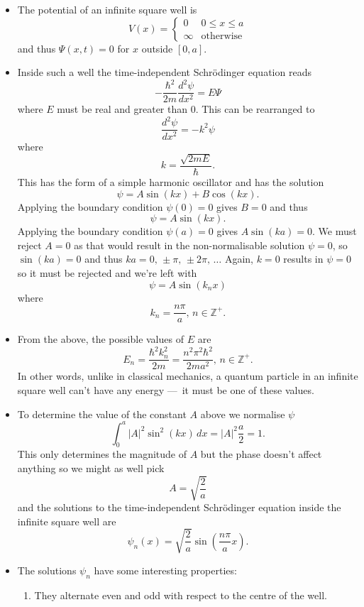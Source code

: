 \documentclass{article}
\begin{document}
\begin{itemize}
  \item The potential of an infinite square well is \[V(x) = \begin{cases}
            0      & 0 \le x \le a    \\
            \infty & \text{otherwise}
          \end{cases}\] and thus $\Psi(x, t) = 0$ for $x$ outside $[0, a]$.

  \item Inside such a well the time-independent Schrödinger equation reads \[-\frac{\hbar^2}{2 m} \frac{d^2 \psi}{d x^2} = E \Psi\] where $E$ must be real and greater than $0$. This can be rearranged to \[\frac{d^2 \psi}{d x^2} = -k^2 \psi\] where \[k = \frac{\sqrt{2 m E}}{\hbar}.\] This has the form of a simple harmonic oscillator and has the solution \[\psi = A \sin (k x) + B \cos (k x).\] Applying the boundary condition $\psi(0) = 0$ gives $B = 0$ and thus \[\psi = A \sin (k x).\] Applying the boundary condition $\psi(a) = 0$ gives $A \sin (k a) = 0$. We must reject $A = 0$ as that would result in the non-normalisable solution $\psi = 0$, so $\sin (k a) = 0$ and thus $k a = 0, \,\pm \pi, \,\pm 2 \pi, \,\ldots$ Again, $k = 0$ results in $\psi = 0$ so it must be rejected and we're left with \[\psi = A \sin (k_n x)\] where \[k_n = \frac{n \pi}{a}, \,n \in \mathbb{Z}^+.\]

  \item From the above, the possible values of $E$ are \[E_n = \frac{\hbar^2 k_n^2}{2 m} = \frac{n^2 \pi^2 \hbar^2}{2 m a^2}, \,n \in \mathbb{Z}^+.\] In other words, unlike in classical mechanics, a quantum particle in an infinite square well can't have any energy — it must be one of these values.

  \item To determine the value of the constant $A$ above we normalise $\psi$ \[\int_0^a |A|^2 \sin^2 (k x) \,d x = |A|^2 \frac{a}{2} = 1.\] This only determines the magnitude of $A$ but the phase doesn't affect anything so we might as well pick \[A = \sqrt{\frac{2}{a}}\] and the solutions to the time-independent Schrödinger equation inside the infinite square well are \[\psi_n(x) = \sqrt{\frac{2}{a}} \sin \left( \frac{n \pi}{a} x \right).\]

  \item The solutions $\psi_n$ have some interesting properties:

        \begin{enumerate}
          \item They alternate even and odd with respect to the centre of the well.


\end{enumerate}
\end{itemize}
\end{document}
